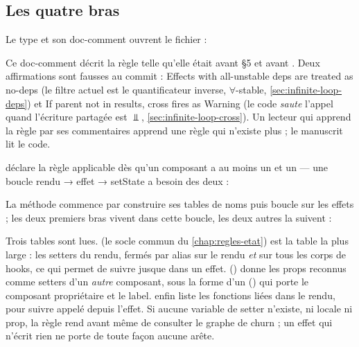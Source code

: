 \subsection{Les quatre bras}

Le type et son doc-comment ouvrent le fichier :


\begin{piege}
Ce doc-comment décrit la règle telle qu'elle était avant  §5 et avant . Deux affirmations sont fausses au commit \snapshotCommit{} : \og Effects with all-unstable deps are treated as no-deps\fg{} (le filtre actuel est le quantificateur inverse, $\forall$-stable, \cref{sec:infinite-loop-deps}) et \og If parent not in results, cross fires as Warning\fg{} (le code \emph{saute} l'appel quand l'écriture partagée est $\Bot$, \cref{sec:infinite-loop-cross}). Un lecteur qui apprend la règle par ses commentaires apprend une règle qui n'existe plus ; le manuscrit lit le code.
\end{piege}

 déclare la règle applicable dès qu'un composant a au moins un  et un  --- une boucle rendu → effet → setState a besoin des deux :


La méthode  commence par construire ses tables de noms puis boucle sur les effets ; les deux premiers bras vivent dans cette boucle, les deux autres la suivent :


Trois tables sont lues.  (le socle commun du \cref{chap:regles-etat}) est la table la plus large : les setters du rendu, fermés par alias sur le rendu \emph{et} sur tous les corps de hooks, ce qui permet de suivre  jusque dans un effet.  () donne les props reconnus comme setters d'un \emph{autre} composant, sous la forme d'un  () qui porte le composant propriétaire et le label.  enfin liste les fonctions liées dans le rendu, pour suivre  appelé depuis l'effet. Si aucune variable de setter n'existe, ni locale ni prop, la règle rend  avant même de consulter le graphe de churn ; un effet qui n'écrit rien ne porte de toute façon aucune arête.

